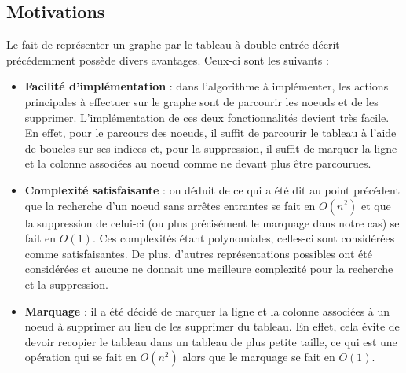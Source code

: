 \subsection*{Motivations}
Le fait de représenter un graphe par le tableau à double entrée décrit précédemment possède divers avantages. Ceux-ci sont les suivants : \\

\begin{itemize}
\item \textbf{Facilité d'implémentation} : dans l'algorithme à implémenter, les actions principales à effectuer sur le graphe sont de parcourir les noeuds et de les supprimer. L'implémentation de ces deux fonctionnalités devient très facile. En effet, pour le parcours des noeuds, il suffit de parcourir le tableau à l'aide de boucles sur ses indices et, pour la suppression, il suffit de marquer la ligne et la colonne associées au noeud comme ne devant plus être parcourues.

\item \textbf{Complexité satisfaisante} : on déduit de ce qui a été dit au point précédent que la recherche d'un noeud sans arrêtes entrantes se fait en $O(n^2)$ et que la suppression de celui-ci (ou plus précisément le marquage dans notre cas) se fait en $O(1)$. Ces complexités étant polynomiales, celles-ci sont considérées comme satisfaisantes. De plus, d'autres représentations possibles ont été considérées et aucune ne donnait une meilleure complexité pour la recherche et la suppression.

\item \textbf{Marquage} : il a été décidé de marquer la ligne et la colonne associées à un noeud à supprimer au lieu de les supprimer du tableau. En effet, cela évite de devoir recopier le tableau dans un tableau de plus petite taille, ce qui est une opération qui se fait en $O(n^2)$ alors que le marquage se fait en $O(1)$.
\end{itemize}
